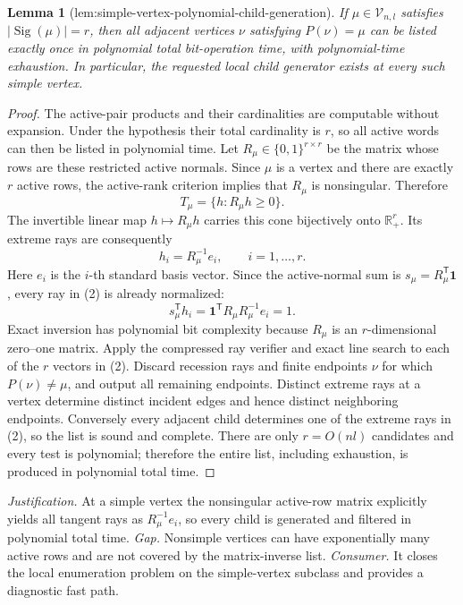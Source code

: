 \documentclass{article}
\newtheorem{lemma}{Lemma}
\begin{document}
\begin{lemma}[lem:simple-vertex-polynomial-child-generation]\label{lem:simple-vertex-polynomial-child-generation}
If \(\mu\in\mathcal V_{n,l}\) satisfies \(|\operatorname{Sig}(\mu)|=r\), then all adjacent vertices \(\nu\) satisfying \(P(\nu)=\mu\) can be listed exactly once in polynomial total bit-operation time, with polynomial-time exhaustion. In particular, the requested local child generator exists at every such simple vertex.
\end{lemma}
\begin{proof}
The active-pair products and their cardinalities are computable without expansion. Under the hypothesis their total cardinality is \(r\), so all active words can then be listed in polynomial time. Let \(R_\mu\in\{0,1\}^{r\times r}\) be the matrix whose rows are these restricted active normals. Since \(\mu\) is a vertex and there are exactly \(r\) active rows, the active-rank criterion implies that \(R_\mu\) is nonsingular. Therefore
\[T_\mu=\{h:R_\mu h\ge0\}.\tag{1}\]
The invertible linear map \(h\mapsto R_\mu h\) carries this cone bijectively onto \(\mathbb R_+^r\). Its extreme rays are consequently
\[h_i=R_\mu^{-1}e_i,\qquad i=1,\ldots,r.\tag{2}\]
Here \(e_i\) is the \(i\)-th standard basis vector. Since the active-normal sum is \(s_\mu=R_\mu^{\mathsf T}\mathbf1\), every ray in (2) is already normalized:
\[s_\mu^{\mathsf T}h_i=\mathbf1^{\mathsf T}R_\mu R_\mu^{-1}e_i=1.\tag{3}\]
Exact inversion has polynomial bit complexity because \(R_\mu\) is an \(r\)-dimensional zero--one matrix. Apply the compressed ray verifier and exact line search to each of the \(r\) vectors in (2). Discard recession rays and finite endpoints \(\nu\) for which \(P(\nu)\ne\mu\), and output all remaining endpoints. Distinct extreme rays at a vertex determine distinct incident edges and hence distinct neighboring endpoints. Conversely every adjacent child determines one of the extreme rays in (2), so the list is sound and complete. There are only \(r=O(nl)\) candidates and every test is polynomial; therefore the entire list, including exhaustion, is produced in polynomial total time.
\end{proof}
\par\smallskip\noindent \textit{Justification.} At a simple vertex the nonsingular active-row matrix explicitly yields all tangent rays as \(R_\mu^{-1}e_i\), so every child is generated and filtered in polynomial total time. \textit{Gap.} Nonsimple vertices can have exponentially many active rows and are not covered by the matrix-inverse list. \textit{Consumer.} It closes the local enumeration problem on the simple-vertex subclass and provides a diagnostic fast path.
\end{document}
